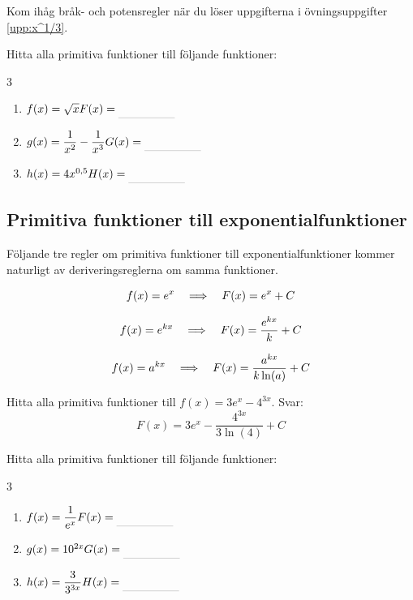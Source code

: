 \documentclass[a4paper, 12pt]{article}
\begin{document}
Kom ihåg bråk- och potensregler när du löser uppgifterna i övningsuppgifter \ref{upp:x^1/3}.

\begin{uppgifter}
    \label{upp:x^1/3}
    Hitta alla primitiva funktioner till följande funktioner: 
    \begin{multicols}{3}
        \begin{enumerate}
            \item $f(x) = \sqrt{x} \\ F(x) \ans$
            \item $g(x) = \dfrac 1{x^2} - \dfrac 1{x^{3}} \\ G(x) \ans$
            \item $h(x) = 4x^{0,5} \\ H(x) \ans$
        \end{enumerate}
    \end{multicols}
\end{uppgifter}

\subsection{Primitiva funktioner till exponentialfunktioner}
Följande tre regler om primitiva funktioner till exponentialfunktioner kommer naturligt av deriveringsreglerna om samma funktioner.

\begin{regel}
    \label{reg:e^x}
    \[f(x) = e^x \hspace{1em} \Longrightarrow \hspace{1em} F(x) = e^x + C\]
\end{regel}

\begin{regel}
    \[f(x) = e^{kx} \hspace{1em} \Longrightarrow \hspace{1em} F(x) = \dfrac{e^{kx}}k + C\]
\end{regel}

\begin{regel}
    \[f(x) = a^{kx} \hspace{1em} \Longrightarrow \hspace{1em} F(x) = \dfrac{a^{kx}}{k\ln(a)} + C\]
\end{regel}


\begin{exempel}
    \label{ex:a^kx}
    Hitta alla primitiva funktioner till $f(x) = 3e^x - 4^{3x}$.
    \dinkus
    Svar: \[F(x) = 3e^x- \dfrac{4^{3x}}{3\ln (4)} + C\]
\end{exempel}

\begin{uppgifter}
    \label{upp:a^kx}
    Hitta alla primitiva funktioner till följande funktioner: 
    \begin{multicols}{3}
        \begin{enumerate}
            \item $f(x) = \dfrac 1{e^x} \\ F(x) \ans$
            \item $g(x) = 10^{2x}  \\ G(x) \ans$
            \item $h(x) = \dfrac 3{3^{3x}} \\ H(x) \ans$
        \end{enumerate}
    \end{multicols}
\end{uppgifter}
\end{document}
